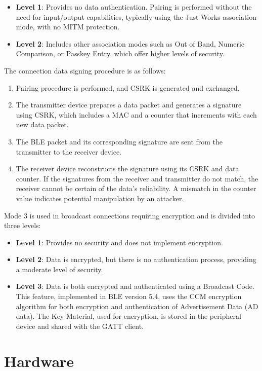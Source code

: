 \documentclass{Configuration_Files/PoliMi3i_thesis}
\begin{document}
\begin{itemize}
    \item \textbf{Level 1}: Provides no data authentication. Pairing is performed without the need for input/output capabilities, typically using the Just Works association mode, with no MITM protection.
    \item \textbf{Level 2}: Includes other association modes such as Out of Band, Numeric Comparison, or Passkey Entry, which offer higher levels of security.
\end{itemize}

The connection data signing procedure is as follows:
\begin{enumerate}
    \item Pairing procedure is performed, and CSRK is generated and exchanged.
    \item The transmitter device prepares a data packet and generates a signature using CSRK, which includes a MAC and a counter that increments with each new data packet.
    \item The BLE packet and its corresponding signature are sent from the transmitter to the receiver device.
    \item The receiver device reconstructs the signature using its CSRK and data counter. If the signatures from the receiver and transmitter do not match, the receiver cannot be certain of the data's reliability. A mismatch in the counter value indicates potential manipulation by an attacker.
\end{enumerate}

Mode 3 is used in broadcast connections requiring encryption and is divided into three levels:
\begin{itemize}
    \item \textbf{Level 1}: Provides no security and does not implement encryption.
    \item \textbf{Level 2}: Data is encrypted, but there is no authentication process, providing a moderate level of security.
    \item \textbf{Level 3}: Data is both encrypted and authenticated using a Broadcast Code. This feature, implemented in BLE version 5.4, uses the CCM encryption algorithm for both encryption and authentication of Advertisement Data (AD data). The Key Material, used for encryption, is stored in the peripheral device and shared with the GATT client.
\end{itemize}


\section{Hardware}
\end{document}
